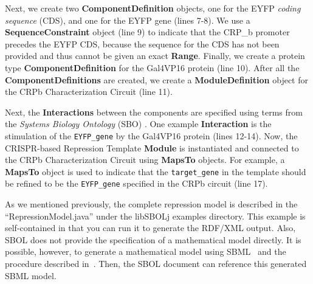 Next, we create two \textbf{ComponentDefinition} objects, one for the EYFP \emph{coding sequence} (CDS), and one for the EYFP gene (lines 7-8). We use a \textbf{SequenceConstraint} object (line 9) to indicate that the CRP\_b promoter precedes the EYFP CDS, because the sequence for the CDS has not been provided and thus cannot be given an exact \textbf{Range}. Finally, we create a protein type \textbf{ComponentDefinition} for the Gal4VP16 protein (line 10). After all the \textbf{ComponentDefinitions} are created, we create a \textbf{ModuleDefinition} object for the CRPb Characterization Circuit (line 11). 

Next, the \textbf{Interactions} between the components are specified using terms from the \emph{Systems Biology Ontology} (SBO) \cite{Courtot2011}.  One example \textbf{Interaction} is the stimulation of the \texttt{EYFP\_gene} by the Gal4VP16 protein (lines 12-14).  Now, the CRISPR-based Repression Template \textbf{Module} is instantiated and connected to the CRPb Characterization Circuit using \textbf{MapsTo} objects.  
For example, a \textbf{MapsTo} object is used to indicate that the \texttt{target\_gene} in the template should be refined to be the \texttt{EYFP\_gene} specified in the CRPb circuit (line 17).  

As we mentioned previously, the complete repression model is described in the ``RepressionModel.java'' under the libSBOLj examples directory. This example is self-contained in that you can run it to generate the RDF/XML output. Also, SBOL does not provide the specification of a mathematical model directly. It is possible, however, to generate a mathematical model using SBML~\cite{SBML} and the procedure described in~\cite{roehner2015generating}. Then, the SBOL document can reference this generated SBML model.


